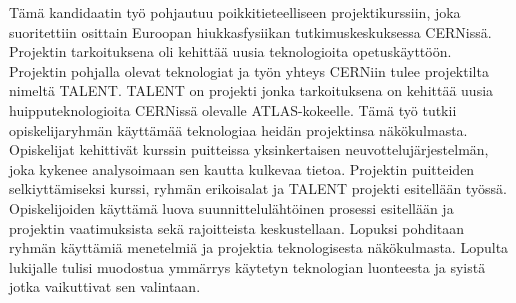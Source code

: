 \documentclass[english,12pt,a4paper,pdftex]{article}
\begin{document}

\begin{otherlanguage}{finnish}
\begin{abstractpage}[finnish]

  Tämä kandidaatin työ pohjautuu poikkitieteelliseen projektikurssiin, joka suoritettiin osittain Euroopan hiukkasfysiikan tutkimuskeskuksessa CERNissä. Projektin tarkoituksena oli kehittää uusia teknologioita opetuskäyttöön. Projektin pohjalla olevat teknologiat ja työn yhteys CERNiin tulee projektilta nimeltä TALENT. TALENT on projekti jonka tarkoituksena on kehittää uusia huipputeknologioita CERNissä olevalle ATLAS-kokeelle. Tämä työ tutkii opiskelijaryhmän käyttämää teknologiaa heidän projektinsa näkökulmasta. Opiskelijat kehittivät kurssin puitteissa yksinkertaisen neuvottelujärjestelmän, joka kykenee analysoimaan sen kautta kulkevaa tietoa. Projektin puitteiden selkiyttämiseksi kurssi, ryhmän erikoisalat ja TALENT projekti esitellään työssä. Opiskelijoiden käyttämä luova suunnittelulähtöinen prosessi esitellään ja projektin vaatimuksista sekä rajoitteista keskustellaan. Lopuksi pohditaan ryhmän käyttämiä menetelmiä ja projektia teknologisesta näkökulmasta. Lopulta lukijalle tulisi muodostua ymmärrys käytetyn teknologian luonteesta ja syistä jotka vaikuttivat sen valintaan.
  
  
\end{abstractpage}
\end{otherlanguage}
\newpage
%





\end{document}
